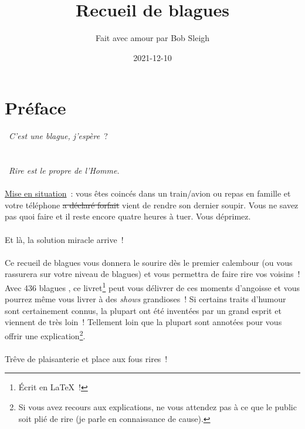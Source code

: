 \documentclass[10pt,a5paper,fullpage]{book}
\title{Recueil de blagues}
\author{Fait avec amour par Bob Sleigh}
\date{2021-12-10}
\begin{document}
	\maketitle
	\tableofcontents
	\newpage
	\section*{Préface}
	\guillemotleft~\textit{C'est une blague, j'espère}~?~\guillemotright\\~ \\ \\
	\guillemotleft~\textit{Rire est le propre de l'Homme.}~\guillemotright\\~ \\
	
	\underline{Mise en situation}~: vous êtes coincés dans un train/avion ou repas en famille et votre téléphone \sout{a déclaré forfait} vient de rendre son dernier soupir. Vous ne savez pas quoi faire et il reste encore quatre heures à tuer. Vous déprimez. \\ \\
	Et là, la solution miracle arrive~! \\ \\
	Ce recueil de blagues vous donnera le sourire dès le premier calembour (ou vous rassurera sur votre niveau de blagues) et vous permettra de faire rire vos voisins~! \\Avec 436 blagues%
	, ce livret\footnote{Écrit en \LaTeX~!} peut vous délivrer de ces moments d'angoisse et vous pourrez même vous livrer à des \textit{shows} grandioses~!
	Si certains traits d'humour sont certainement connus, la plupart ont été inventées par un grand esprit et viennent de très loin~! Tellement loin que la plupart sont annotées pour vous offrir une explication\footnote{Si vous avez recours aux explications, ne vous attendez pas à ce que le public soit plié de rire (je parle en connaissance de cause).}. \\ \\
	Trêve de plaisanterie et place aux fous rires~!
	
\end{document}
